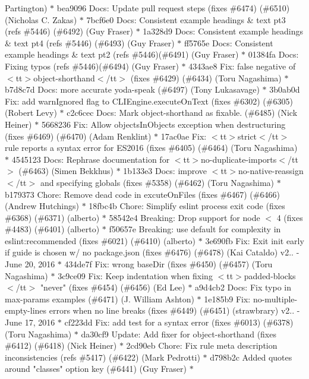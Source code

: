 \begin{DoxyItemize}
Partington) \texorpdfstring{$\ast$}{*} bea9096 Docs\+: Update pull request steps (fixes \#6474) (\#6510) (\+Nicholas C. Zakas) \texorpdfstring{$\ast$}{*} 7bcf6e0 Docs\+: Consistent example headings \& text pt3 (refs \#5446) (\#6492) (\+Guy Fraser) \texorpdfstring{$\ast$}{*} 1a328d9 Docs\+: Consistent example headings \& text pt4 (refs \#5446) (\#6493) (\+Guy Fraser) \texorpdfstring{$\ast$}{*} ff5765e Docs\+: Consistent example headings \& text pt2 (refs \#5446)(\#6491) (\+Guy Fraser) \texorpdfstring{$\ast$}{*} 01384fa Docs\+: Fixing typos (refs \#5446)(\#6494) (\+Guy Fraser) \texorpdfstring{$\ast$}{*} 4343ae8 Fix\+: false negative of $<$tt$>$object-\/shorthand$<$/tt$>$ (fixes \#6429) (\#6434) (\+Toru Nagashima) \texorpdfstring{$\ast$}{*} b7d8c7d Docs\+: more accurate yoda-\/speak (\#6497) (\+Tony Lukasavage) \texorpdfstring{$\ast$}{*} 3b0ab0d Fix\+: add warn\+Ignored flag to CLIEngine.\+execute\+On\+Text (fixes \#6302) (\#6305) (\+Robert Levy) \texorpdfstring{$\ast$}{*} c2c6cec Docs\+: Mark object-\/shorthand as fixable. (\#6485) (\+Nick Heiner) \texorpdfstring{$\ast$}{*} 5668236 Fix\+: Allow objects\+In\+Objects exception when destructuring (fixes \#6469) (\#6470) (\+Adam Renklint) \texorpdfstring{$\ast$}{*} 17ac0ae Fix\+: $<$tt$>$strict$<$/tt$>$ rule reports a syntax error for ES2016 (fixes \#6405) (\#6464) (\+Toru Nagashima) \texorpdfstring{$\ast$}{*} 4545123 Docs\+: Rephrase documentation for $<$tt$>$no-\/duplicate-\/imports$<$/tt$>$ (\#6463) (\+Simen Bekkhus) \texorpdfstring{$\ast$}{*} 1b133e3 Docs\+: improve $<$tt$>$no-\/native-\/reassign$<$/tt$>$ and specifying globals (fixes \#5358) (\#6462) (\+Toru Nagashima) \texorpdfstring{$\ast$}{*} b179373 Chore\+: Remove dead code in excute\+On\+Files (fixes \#6467) (\#6466) (\+Andrew Hutchings) \texorpdfstring{$\ast$}{*} 18fbc4b Chore\+: Simplify eslint process exit code (fixes \#6368) (\#6371) (alberto) \texorpdfstring{$\ast$}{*} 58542e4 Breaking\+: Drop support for node $<$ 4 (fixes \#4483) (\#6401) (alberto) \texorpdfstring{$\ast$}{*} f50657e Breaking\+: use default for complexity in eslint\+:recommended (fixes \#6021) (\#6410) (alberto) \texorpdfstring{$\ast$}{*} 3e690fb Fix\+: Exit init early if guide is chosen w/ no package.\+json (fixes \#6476) (\#6478) (\+Kai Cataldo)  v2.. -\/ June 20, 2016  \texorpdfstring{$\ast$}{*} 434de7f Fix\+: wrong base\+Dir (fixes \#6450) (\#6457) (\+Toru Nagashima) \texorpdfstring{$\ast$}{*} 3c9ce09 Fix\+: Keep indentation when fixing $<$tt$>$padded-\/blocks$<$/tt$>$ "{}never"{} (fixes \#6454) (\#6456) (\+Ed Lee) \texorpdfstring{$\ast$}{*} a9d4cb2 Docs\+: Fix typo in max-\/params examples (\#6471) (\+J. William Ashton) \texorpdfstring{$\ast$}{*} 1e185b9 Fix\+: no-\/multiple-\/empty-\/lines errors when no line breaks (fixes \#6449) (\#6451) (strawbrary)  v2.. -\/ June 17, 2016  \texorpdfstring{$\ast$}{*} cf223dd Fix\+: add test for a syntax error (fixes \#6013) (\#6378) (\+Toru Nagashima) \texorpdfstring{$\ast$}{*} da30cf9 Update\+: Add fixer for object-\/shorthand (fixes \#6412) (\#6418) (\+Nick Heiner) \texorpdfstring{$\ast$}{*} 2cd90eb Chore\+: Fix rule meta description inconsistencies (refs \#5417) (\#6422) (\+Mark Pedrotti) \texorpdfstring{$\ast$}{*} d798b2c Added quotes around "{}classes"{} option key (\#6441) (\+Guy Fraser) \texorpdfstring{$\ast$}{*} 
\end{DoxyItemize}
